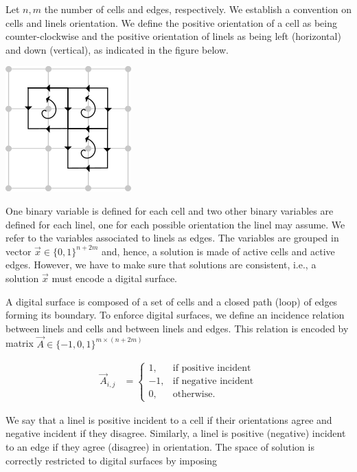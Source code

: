 Let $n,m$ the number of cells and edges, respectively. We establish a convention on cells and linels orientation. We define the positive orientation of a cell as being counter-clockwise and the positive orientation of linels as being left (horizontal) and down (vertical), as indicated in the figure below. 

\begin{center}
\includegraphics[scale=0.6]{figures/chapter4/schoenemann/schoenemann_cell_linel_orientation.png}
\end{center}

One binary variable is defined for each cell and two other binary variables are defined for each linel, one for each possible orientation the linel may assume. We refer to the variables associated to linels as edges. The variables are grouped in vector $\vec{x} \in \{0,1\}^{n+2m}$ and, hence, a solution is made of active cells and active edges. However, we have to make sure that solutions are consistent, i.e., a solution $\vec{x}$ must encode a digital surface. 

A digital surface is composed of a set of cells and a closed path (loop) of edges forming its boundary. To enforce digital surfaces, we define an incidence relation between linels and cells and between linels and edges. This relation is encoded by matrix $\vec{A} \in \{-1,0,1\}^{m\times(n+2m)}$ 

\begin{align*}
	\vec{A}_{i,j} &= \left\{ \begin{array}{rl}
		1,& \text{if positive incident}\\
		-1,& \text{if negative incident}\\
		0,& \text{otherwise}.		
	\end{array}\right.
\end{align*}

We say that a linel is positive incident to a cell if their orientations agree and negative incident if they disagree. Similarly, a linel is positive (negative) incident to an edge if they agree (disagree) in orientation. The space of solution is correctly restricted to digital surfaces by imposing

